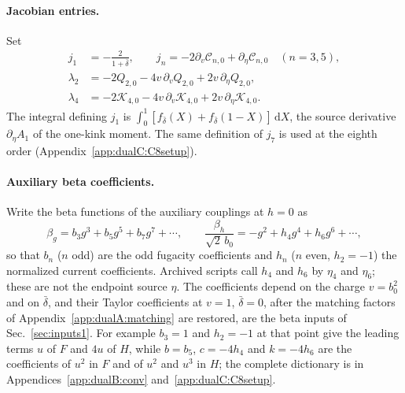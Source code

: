 \documentclass[11pt,a4paper]{article}
\numberwithin{equation}{section}
\newcommand{\dd}{\,\mathrm d}
\newcommand{\db}{\bar\delta}
\begin{document}
\paragraph{Jacobian entries.} Set
\begin{equation}
\begin{aligned}
 j_1&=-\frac{2}{1+\db},\qquad j_n=-2\partial_v\mathcal C_{n,0}+\partial_\eta\mathcal C_{n,0}\quad(n=3,5),\\
 \lambda_2&=-2Q_{2,0}-4v\,\partial_vQ_{2,0}+2v\,\partial_\eta Q_{2,0},\\
 \lambda_4&=-2\mathcal K_{4,0}-4v\,\partial_v\mathcal K_{4,0}+2v\,\partial_\eta\mathcal K_{4,0}.
\end{aligned}
\label{eq:dualA:jacobian}
\end{equation}
The integral defining $j_1$ is $\int_0^1[f_{\db}(X)+f_{\db}(1-X)]\dd X$, the source derivative $\partial_\eta A_1$ of
the one-kink moment. The same definition of $j_7$ is used at the eighth order (Appendix~\ref{app:dualC:C8setup}).

\paragraph{Auxiliary beta coefficients.} Write the beta functions of the auxiliary couplings at $h=0$ as
\begin{equation}
 \beta_g=b_3g^3+b_5g^5+b_7g^7+\cdots,\qquad
 \frac{\beta_h}{\sqrt2\,b_0}=-g^2+h_4g^4+h_6g^6+\cdots,
 \label{eq:dualA:auxbeta}
\end{equation}
so that $b_n$ ($n$ odd) are the odd fugacity coefficients and $h_n$ ($n$ even, $h_2=-1$) the normalized current
coefficients. Archived scripts call $h_4$ and $h_6$ by $\eta_4$ and $\eta_6$; these are not the endpoint source $\eta$.
The coefficients depend on the charge $v=b_0^2$ and on $\db$, and their Taylor coefficients at $v=1$, $\db=0$, after
the matching factors of Appendix~\ref{app:dualA:matching} are restored, are the beta inputs of
Sec.~\ref{sec:inputs1}. For example $b_3=1$ and $h_2=-1$ at that point give the leading terms $u$ of $F$ and $4u$ of
$H$, while $b=b_5$, $c=-4h_4$ and $k=-4h_6$ are the coefficients of $u^2$ in $F$ and of $u^2$ and $u^3$ in $H$; the complete dictionary is in Appendices~\ref{app:dualB:conv} and~\ref{app:dualC:C8setup}.
\end{document}
